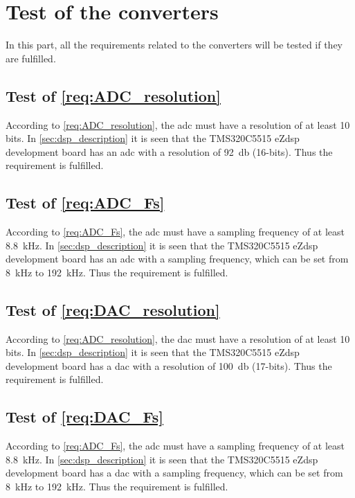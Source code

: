 \section{Test of the converters}
In this part, all the requirements related to the converters will be tested if they are fulfilled. 


\subsection{Test of \autoref{req:ADC_resolution}}
According to \autoref{req:ADC_resolution}, the \gls{adc} must have a resolution of at least 10 bits. In \autoref{sec:dsp_description} it is seen that the TMS320C5515 eZdsp development board has an \gls{adc} with a resolution of \SI{92}{\decibel} (16-bits). Thus the requirement is fulfilled.  

\subsection{Test of \autoref{req:ADC_Fs}}
According to \autoref{req:ADC_Fs}, the \gls{adc} must have a sampling frequency of at least \SI{8.8}{\kilo\hertz}. In \autoref{sec:dsp_description} it is seen that the TMS320C5515 eZdsp development board has an \gls{adc} with a sampling frequency, which can be set from \SI{8}{\kilo\hertz} to \SI{192}{\kilo\hertz}. Thus the requirement is fulfilled.

\subsection{Test of \autoref{req:DAC_resolution}}
According to \autoref{req:ADC_resolution}, the \gls{dac} must have a resolution of at least 10 bits. In \autoref{sec:dsp_description} it is seen that the TMS320C5515 eZdsp development board has a \gls{dac} with a resolution of \SI{100}{\decibel} (17-bits). Thus the requirement is fulfilled.  

\subsection{Test of \autoref{req:DAC_Fs}}
According to \autoref{req:ADC_Fs}, the \gls{adc} must have a sampling frequency of at least \SI{8.8}{\kilo\hertz}. In \autoref{sec:dsp_description} it is seen that the TMS320C5515 eZdsp development board has a \gls{dac} with a sampling frequency, which can be set from \SI{8}{\kilo\hertz} to \SI{192}{\kilo\hertz}. Thus the requirement is fulfilled.
 
